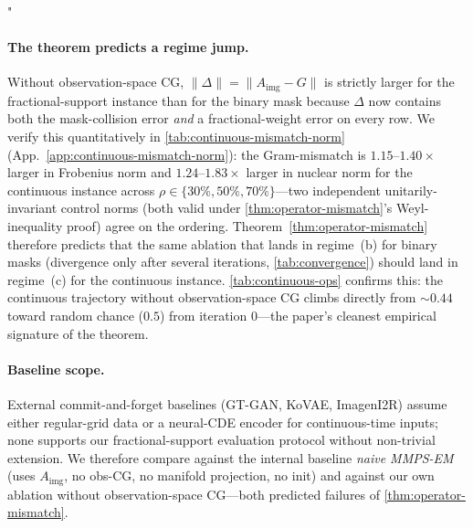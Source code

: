 "\documentclass{article}
\theoremstyle{plain}
\theoremstyle{definition}
\theoremstyle{remark}
\newcommand{\Aimg}{A_{\mathrm{img}}}
\begin{document}
\paragraph{The theorem predicts a regime jump.}
Without observation-space CG, $\|\Delta\| = \|\Aimg - G\|$ is strictly larger for the fractional-support instance than for the binary mask because $\Delta$ now contains both the mask-collision error \emph{and} a fractional-weight error on every row. We verify this quantitatively in \cref{tab:continuous-mismatch-norm} (App.~\ref{app:continuous-mismatch-norm}): the Gram-mismatch is $1.15$--$1.40\times$ larger in Frobenius norm and $1.24$--$1.83\times$ larger in nuclear norm for the continuous instance across $\rho \in \{30\%, 50\%, 70\%\}$---two independent unitarily-invariant control norms (both valid under \cref{thm:operator-mismatch}'s Weyl-inequality proof) agree on the ordering. Theorem~\ref{thm:operator-mismatch} therefore predicts that the same ablation that lands in regime~(b) for binary masks (divergence only after several iterations, \cref{tab:convergence}) should land in regime~(c) for the continuous instance. \cref{tab:continuous-ops} confirms this: the continuous trajectory without observation-space CG climbs directly from ${\sim}0.44$ toward random chance ($0.5$) from iteration $0$---the paper's cleanest empirical signature of the theorem.

\paragraph{Baseline scope.}
External commit-and-forget baselines (GT-GAN, KoVAE, ImagenI2R) assume either regular-grid data or a neural-CDE encoder for continuous-time inputs; none supports our fractional-support evaluation protocol without non-trivial extension. We therefore compare against the internal baseline \emph{naive MMPS-EM} (uses $\Aimg$, no obs-CG, no manifold projection, no init) and against our own ablation without observation-space CG---both predicted failures of \cref{thm:operator-mismatch}.
\end{document}
